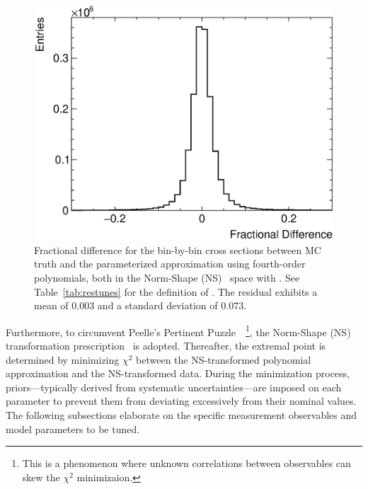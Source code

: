 \begin{figure}[!htb] 	
    \centering 		
    \includegraphics[width=\sgfigwid\textwidth]{figures/tuning/residual.eps}
    \caption{\label{fig:residual} Fractional difference for the bin-by-bin cross sections between MC truth and the parameterized approximation using fourth-order polynomials, both in the Norm-Shape (NS)~\cite{DAgostini:1993arp,Hanson:2005mrg} space with \allpar. See Table~\ref{tab:restunes} for the definition of \allpar. The residual exhibits a mean of $0.003$ and a standard deviation of $0.073$.} 
\end{figure}

Furthermore, to circumvent Peelle's Pertinent Puzzle~\cite{PPP_FNL,Chakrani:2023htw}~\footnote{This is a phenomenon where unknown correlations between observables can skew the $\chi^2$ minimizaion.}, the Norm-Shape (NS) transformation prescription~\cite{DAgostini:1993arp,Hanson:2005mrg} is adopted. 
Thereafter, the extremal point is determined by minimizing $\chi^2$ between the NS-transformed polynomial approximation and the NS-transformed data. 
During the minimization process, priors—typically derived from systematic uncertainties—are imposed on each parameter to prevent them from deviating excessively from their nominal values. 
The following subsections elaborate on the specific measurement observables and model parameters to be tuned.

